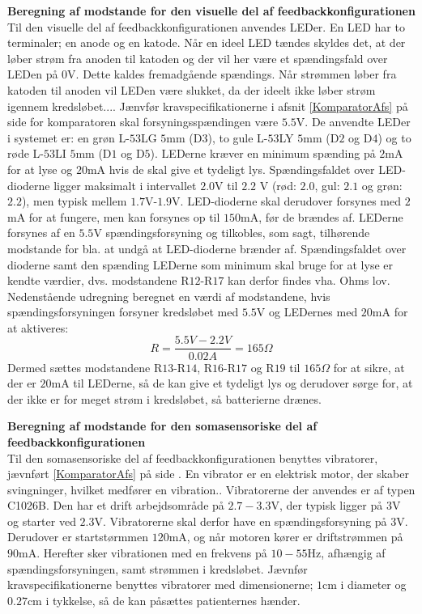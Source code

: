 \noindent\textbf{Beregning af modstande for den visuelle del af feedbackkonfigurationen} \\
Til den visuelle del af feedbackkonfigurationen anvendes LEDer. En LED har to terminaler; en anode og en katode. Når en ideel LED tændes skyldes det, at der løber strøm fra anoden til katoden og der vil her være et spændingsfald over LEDen på 0V. Dette kaldes fremadgående spændings. Når strømmen løber fra katoden til anoden vil LEDen være slukket, da der ideelt ikke løber strøm igennem kredsløbet....  Jænvfør kravspecifikationerne i afsnit \ref{KomparatorAfs} på side \pageref{KomparatorAfs} for komparatoren skal forsyningsspændingen være $5.5$V. De anvendte LEDer i systemet er: en grøn L-$53$LG $5$mm (D$3$), to gule L-$53$LY $5$mm (D$2$ og D$4$) og to røde L-$53$LI $5$mm (D$1$ og D$5$). LEDerne kræver en minimum spænding på $2$mA for at lyse og $20$mA hvis de skal give et tydeligt lys.  Spændingsfaldet over LED-dioderne ligger maksimalt i intervallet $2.0$V til $2.2$ V (rød: $2.0$, gul: $2.1$ og grøn: $2.2$), men typisk mellem $1.7$V-$1.9$V. LED-dioderne skal derudover forsynes med $2$mA for at fungere, men kan forsynes op til $150$mA, før de brændes af. LEDerne forsynes af en $5.5$V spændingsforsyning og tilkobles, som sagt, tilhørende modstande for bla. at undgå at LED-dioderne brænder af. \cite{kingbright} Spændingsfaldet over dioderne samt den spænding LEDerne som minimum skal bruge for at lyse er kendte værdier, dvs. modstandene R$12$-R$17$ kan derfor findes vha. Ohms lov. Nedenstående udregning beregnet en værdi af modstandene, hvis spændingsforsyningen forsyner kredsløbet med $5.5$V og LEDernes med $20$mA for at aktiveres:
\begin{equation}
R = \dfrac{5.5V - 2.2V}{0.02A} = 165\Omega
\end{equation}
\noindent Dermed sættes modstandene R$13$-R$14$, R$16$-R$17$ og R$19$ til $165\Omega$ for at sikre, at der er $20$mA til LEDerne, så de kan give et tydeligt lys og derudover sørge for, at der ikke er for meget strøm i kredsløbet, så batterierne drænes. 

\noindent\textbf{Beregning af modstande for den somasensoriske del af feedbackkonfigurationen} \\
Til den somasensoriske del af feedbackkonfigurationen benyttes vibratorer, jævnført \ref{KomparatorAfs} på side \pageref{KomparatorAfs}. En vibrator er en elektrisk motor, der skaber svingninger, hvilket medfører en vibration.\cite{Radaktionen2009}. Vibratorerne der anvendes er af typen C1026B. Den har et drift arbejdsområde på $2.7-3.3$V, der typisk ligger på $3$V og starter ved $2.3$V. Vibratorerne skal derfor have en spændingsforsyning på $3$V. Derudover er startstørmmen $120$mA, og når motoren kører er driftstrømmen på $90$mA. Herefter sker vibrationen med en frekvens på $10-55$Hz, afhængig af spændingsforsyningen, samt strømmen i kredsløbet. \cite{Machinery2009} Jævnfør kravspecifikationerne benyttes vibratorer med dimensionerne; $1$cm i diameter og $0.27$cm i tykkelse, så de kan påsættes patienternes hænder. 
 
